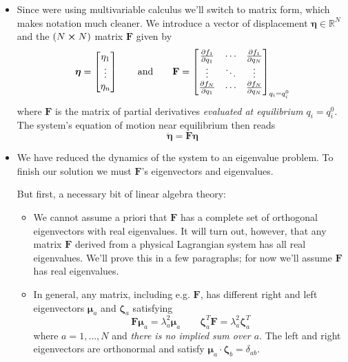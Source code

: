 \documentclass[11pt, a4paper]{article}
\newcommand{\eqtext}[1]{\qquad \text{#1} \qquad}
\newcommand{\R}{\mathbb{R}} %
\newcommand{\mat}[1]{\mathbf{#1}} %
\begin{document}
\begin{itemize}
	\item Since were using multivariable calculus we'll switch to matrix form, which makes notation much cleaner. We introduce a vector of displacement $ \bm{\eta} \in \R^{N}$ and the $ (N \cross N) $ matrix $\mat{F}$ given by
	\begin{equation*}
		\bm{\eta} =
		\begin{bmatrix}
			 \eta_1\\
			 \vdots\\
			 \eta_n
		\end{bmatrix}
		\eqtext{and}
		\mathbf{F} =
		\begin{bmatrix}
			\pdv{f_1}{q_1} & \cdots & \pdv{f_1}{q_N}\\
			\vdots & \ddots & \vdots\\
			\pdv{f_N}{q_1} & \cdots & \pdv{f_N}{q_N}\\
		\end{bmatrix}_{q_i = q_{i}^{0}}
	\end{equation*}
	where $ \mat{F} $ is the matrix of partial derivatives \textit{evaluated at equilibrium} $ q_{i} = q_{i}^{0} $. The system's equation of motion near equilibrium then reads
	\begin{equation*}
		\ddot{\bm{\eta}} = \mathbf{F} \bm{\eta}
	\end{equation*}

	\item We have reduced the dynamics of the system to an eigenvalue problem. To finish our solution we must $ \mathbf{F} $'s eigenvectors and eigenvalues. 
	
	But first, a necessary bit of linear algebra theory:
	\begin{itemize}
		\item 	We cannot assume a priori that $ \mat{F} $ has a complete set of orthogonal eigenvectors with real eigenvalues. It will turn out, however, that any matrix $ \mat{F} $ derived from a physical Lagrangian system has all real eigenvalues. We'll prove this in a few paragraphs; for now we'll assume $ \mat{F} $ has real eigenvalues.
		
		\item In general, any matrix, including e.g. $ \mathbf{F} $, has different right and left eigenvectors $ \bm{\mu}_{a} $ and $ \bm{\zeta}_{a} $ satisfying
		\begin{equation*}
			\mathbf{F} \bm{\mu}_{a} = \lambda_a^2 \bm{\mu}_{a}  \qquad  \bm{\zeta}_{a}^{T} \mathbf{F} = \lambda_{a}^{2} \bm{\zeta}_{a}^{T}
		\end{equation*}
		where $ a = 1, \dots, N $ and \textit{there is no implied sum over $ a $}. The left and right eigenvectors are orthonormal and satisfy $ \bm{\mu}_{a} \cdot \bm{\zeta}_{b} = \delta_{ab} $. 
		

\end{itemize}
\end{itemize}
\end{document}
